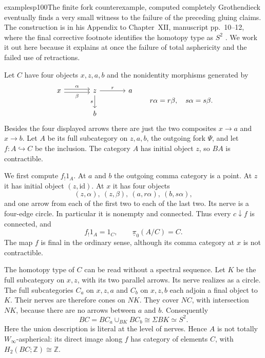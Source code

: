 \begin{dcomment}{examples}{p100}{The finite fork counterexample, computed completely}
Grothendieck eventually finds a very small witness to the failure of the preceding gluing claims. The construction is in his Appendix to Chapter~XII, manuscript pp.~10--12, where the final corrective footnote identifies the homotopy type as $S^2$ \citep{GrothendieckDerivateursXIIAppendix}. We work it out here because it explains at once the failure of total asphericity and the failed use of retractions.

Let $C$ have four objects $x,z,a,b$ and the nonidentity morphisms generated by
\[
\begin{tikzcd}[column sep=large]
x\arrow[r,shift left=.5ex,"\alpha"]\arrow[r,shift right=.5ex,"\beta"']&z\arrow[r,"r"]\arrow[d,"s"']&a\\
&b&
\end{tikzcd}
\qquad r\alpha=r\beta,\quad s\alpha=s\beta.
\]
Besides the four displayed arrows there are just the two composites $x\to a$ and $x\to b$. Let $A$ be its full subcategory on $z,a,b$, the outgoing fork $\Psi$, and let $f:A\hookrightarrow C$ be the inclusion. The category $A$ has initial object $z$, so $BA$ is contractible.

We first compute $f_!1_A$. At $a$ and $b$ the outgoing comma category is a point. At $z$ it has initial object $(z,\mathrm{id})$. At $x$ it has four objects
\[
(z,\alpha),\ (z,\beta),\ (a,r\alpha),\ (b,s\alpha),
\]
and one arrow from each of the first two to each of the last two. Its nerve is a four-edge circle. In particular it is nonempty and connected. Thus every $c\downarrow f$ is connected, and
\[
f_!1_A=1_C,\qquad \underline\pi_0(A/C)=C.
\]
The map $f$ is final in the ordinary sense, although its comma category at $x$ is not contractible.

The homotopy type of $C$ can be read without a spectral sequence. Let $K$ be the full subcategory on $x,z$, with its two parallel arrows. Its nerve realizes as a circle. The full subcategories $C_a$ on $x,z,a$ and $C_b$ on $x,z,b$ each adjoin a final object to $K$. Their nerves are therefore cones on $NK$. They cover $NC$, with intersection $NK$, because there are no arrows between $a$ and $b$. Consequently
\[
BC=BC_a\cup_{BK}BC_b\cong\Sigma BK\simeq S^2.
\]
Here the union description is literal at the level of nerves. Hence $A$ is not totally $W_\infty$-aspherical: its direct image along $f$ has category of elements $C$, with $H_2(BC;\mathbb Z)\cong\mathbb Z$.


\end{dcomment}
